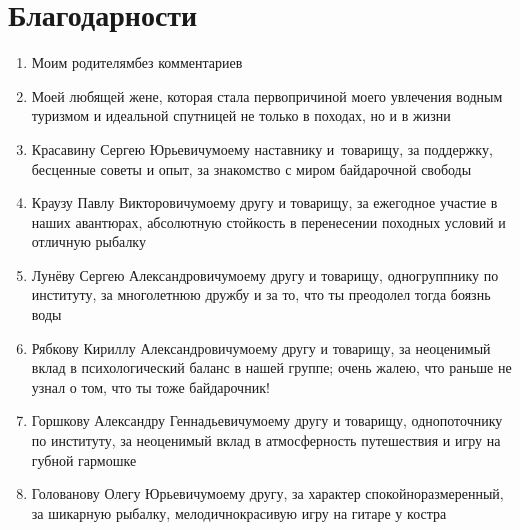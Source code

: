 \newpage
{
\pagestyle{empty}
\section*{Благодарности}

\begin{enumerate}
\item Моим родителям\mdash без комментариев
%
\item Моей любящей жене, которая стала первопричиной моего увлечения водным туризмом и идеальной спутницей не только в походах, но и в жизни
%
\item Красавину\: Сергею\: Юрьевичу\mdash моему наставнику и~товарищу, за поддержку, бесценные советы и опыт, за знакомство с миром байдарочной свободы
%
\item Краузу\: Павлу\: Викторовичу\mdash моему другу и товарищу, за ежегодное участие в наших авантюрах, абсолютную стойкость в перенесении походных условий и отличную рыбалку 
%
\item Лунёву\: Сергею\: Александровичу\mdash моему другу и товарищу, одногруппнику по институту, за многолетнюю дружбу и за то, что ты преодолел тогда боязнь воды
%
\item Рябкову\: Кириллу\: Александровичу\mdash моему другу и товарищу, за неоценимый вклад в психологический баланс в нашей группе; очень жалею, что раньше не узнал о том, что ты тоже байдарочник!
%
\item Горшкову\: Александру\: Геннадьевичу\mdash моему другу и товарищу, однопоточнику по институту, за неоценимый вклад в атмосферность путешествия и игру на губной гармошке
%
\item Голованову\: Олегу\: Юрьевичу\mdash моему другу, за характер спокойно\sdash размеренный, за шикарную рыбалку, мелодично\sdash красивую игру на гитаре у костра

\end{enumerate}
}
